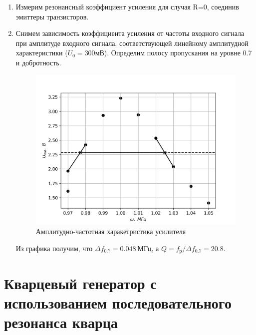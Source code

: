 \documentclass[14pt, a4paper]{article}
\begin{document}
\begin{enumerate}
\item Измерим резонансный коэффициент усиления для случая R=0, соединив эмиттеры транзисторов.

\item Снимем зависимость коэффициента усиления от частоты входного сигнала при амплитуде входного сигнала, соответствующей линейному амплитудной характеристики ($U_0=300 мВ$). Определим полосу пропускания на уровне 0.7 и добротность.

\begin{figure}[H]
\centering
\includegraphics[scale=0.6]{../images/rt1-2}
\caption{Амплитудно-частотная харакетристика усилителя}
\end{figure}

Из графика получим, что $\Delta f_{0.7}=0.048\ МГц$, а $Q=f_{р}/\Delta f_{0.7}=20.8$.

\end{enumerate}

\section{Кварцевый генератор с использованием последовательного резонанса кварца}
\end{document}
